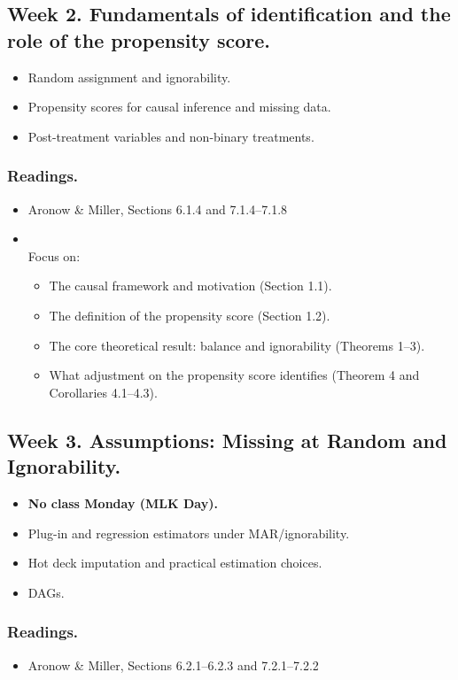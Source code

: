 \documentclass[letterpaper, 12pt, parskip=full,DIV=10]{scrartcl}
\begin{document}
\subsection*{Week 2. Fundamentals of identification and the role of the propensity score.}
\begin{itemize}
\item Random assignment and ignorability.
\item Propensity scores for causal inference and missing data.
\item Post-treatment variables and non-binary treatments.
\end{itemize}

\subsubsection*{Readings.}
\begin{itemize}
\item Aronow \& Miller, Sections 6.1.4 and 7.1.4--7.1.8
\item {} \\
Focus on:
\begin{itemize}
  \item The causal framework and motivation (Section 1.1).
  \item The definition of the propensity score (Section 1.2).
  \item The core theoretical result: balance and ignorability (Theorems 1--3).
  \item What adjustment on the propensity score identifies (Theorem 4 and Corollaries 4.1--4.3).
\end{itemize}
\end{itemize}

\subsection*{Week 3. Assumptions: Missing at Random and Ignorability.}
\begin{itemize}
\item \textbf{No class Monday (MLK Day).}
\item Plug-in and regression estimators under MAR/ignorability.
\item Hot deck imputation and practical estimation choices.
\item DAGs. 
\end{itemize}

\subsubsection*{Readings.}
\begin{itemize} 
\item Aronow \& Miller, Sections 6.2.1--6.2.3 and 7.2.1--7.2.2
\end{itemize}
\end{document}
